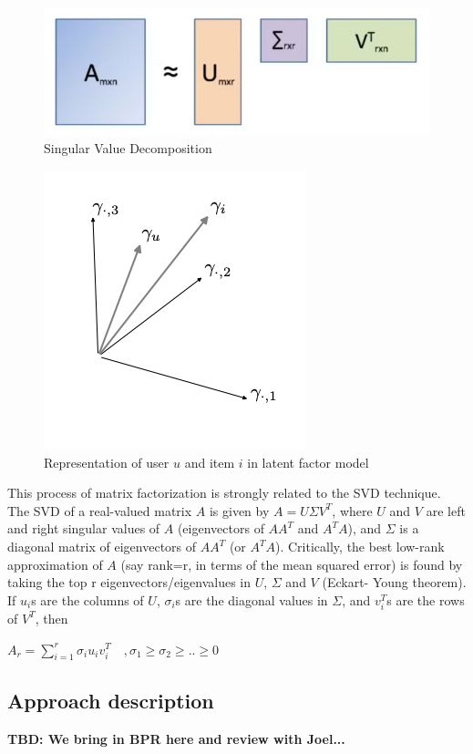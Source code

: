 \documentclass{article}
\begin{document}
\begin{figure}[h]
    \centering
    \includegraphics[width=0.75\linewidth]{images/image2.png}
    \caption{Singular Value Decomposition}
    \label{fig:svd}
\end{figure}

\begin{figure}[h]
    \includegraphics[width=0.4\linewidth]{images/ui_vectors.png}
    \caption{Representation of user $u$ and item $i$ in latent factor model}
    \label{fig:ui_vectors}
\end{figure}

This process of matrix factorization is strongly related to the SVD technique. The SVD of a real-valued matrix $A$ is given by $A=U \Sigma V^T$, where $U$ and $V$ are left and right singular values of $A$ (eigenvectors of $AA^T$ and $A^T A$), and $\Sigma$ is a diagonal matrix of eigenvectors of $AA^T$ (or $A^T A$). Critically, the best low-rank approximation of $A$ (say rank=r, in terms of the mean squared error) is found by taking the top r eigenvectors/eigenvalues in $U$, $\Sigma$ and $V$ (Eckart- Young theorem). If $u_i$s are the columns of $U$, $\sigma_i$s are the diagonal values in $\Sigma$, and $v_i^T$s are the rows of $V^T$, then

$A_r = \sum_{i=1}^{r} \sigma_i u_i v_i^T \quad , \sigma_1 \ge \sigma_2 \ge .. \ge 0$

\subsection{Approach description}
\textbf{TBD: We bring in BPR here and review with Joel...}
\end{document}
